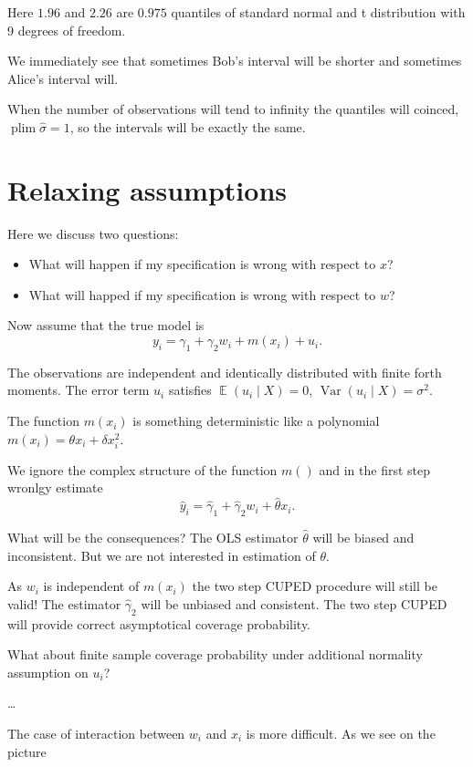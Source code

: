 \documentclass[10pt, a4paper]{article}
\DeclareMathOperator*\plim{plim}
\DeclareMathOperator{\Var}{Var}
\DeclareMathOperator{\E}{\mathbb{E}}
\begin{document}
Here $1.96$ and $2.26$ are $0.975$ quantiles of 
standard normal and t distribution with 9 degrees of freedom. 


We immediately see that sometimes Bob's interval will be shorter and sometimes Alice's interval will. 

When the number of observations will tend to infinity the quantiles will coinced, 
$\plim \hat\sigma =1$, 
so the intervals will be exactly the same. 

\section{Relaxing assumptions}

Here we discuss two questions:

\begin{itemize}
    \item What will happen if my specification is wrong with respect to $x$?
    \item What will happed if my specification is wrong with respect to $w$?
\end{itemize}

Now assume that the true model is 
\[
    y_i = \gamma_1 + \gamma_2 w_i + m(x_i) + u_i.
\]
    
The observations are independent and identically distributed with finite forth moments. 
The error term $u_i$ satisfies $\E(u_i \mid X) = 0$, $\Var(u_i \mid X) = \sigma^2$.
    
The function $m(x_i)$ is something deterministic like a polynomial $m(x_i) = \theta x_i + \delta x_i^2$.

We ignore the complex structure of the function $m()$ and in the first step wronlgy estimate 
\[
    \hat y_i = \hat \gamma_1 + \hat \gamma_2 w_i + \hat \theta x_i.
\]

What will be the consequences? The OLS estimator $\hat\theta$ will be biased and inconsistent. 
But we are not interested in estimation of $\theta$. 

As $w_i$ is independent of $m(x_i)$ the two step CUPED procedure will still be valid!
The estimator $\hat\gamma_2$ will be unbiased and consistent. 
The two step CUPED will provide correct asymptotical coverage probability.

What about finite sample coverage probability under additional normality assumption on $u_i$?


\dots


The case of interaction between $w_i$ and $x_i$ is more difficult. 
As we see on the picture
\end{document}
